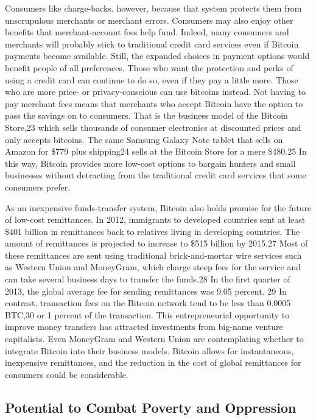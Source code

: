 Consumers like charge-backs, however, because that system
protects them from unscrupulous merchants or merchant errors.
Consumers may also enjoy other benefits that merchant-account
fees help fund. Indeed, many consumers and merchants will probably
stick to traditional credit card services even if Bitcoin payments
become available. Still, the expanded choices in payment
options would benefit people of all preferences.
Those who want the protection and perks of using a credit
card can continue to do so, even if they pay a little more. Those
who are more price- or privacy-conscious can use bitcoins
instead. Not having to pay merchant fees means that merchants
who accept Bitcoin have the option to pass the savings on to consumers.
That is the business model of the Bitcoin Store,23 which
sells thousands of consumer electronics at discounted prices and
only accepts bitcoins. The same Samsung Galaxy Note tablet that
sells on Amazon for \$779 plus shipping24 sells at the Bitcoin Store
for a mere \$480.25 In this way, Bitcoin provides more low-cost
options to bargain hunters and small businesses without detracting
from the traditional credit card services that some consumers
prefer.

As an inexpensive funds-transfer system, Bitcoin also holds
promise for the future of low-cost remittances. In 2012, immigrants
to developed countries sent at least \$401 billion in remittances
back to relatives living in developing countries. The
amount of remittances is projected to increase to \$515 billion
by 2015.27 Most of these remittances are sent using traditional
brick-and-mortar wire services such as Western Union and
MoneyGram, which charge steep fees for the service and can take
several business days to transfer the funds.28 In the first quarter of
2013, the global average fee for sending remittances was 9.05 percent.
29 In contrast, transaction fees on the Bitcoin network tend
to be less than 0.0005 BTC,30 or 1 percent of the transaction. This
entrepreneurial opportunity to improve money transfers has
attracted investments from big-name venture capitalists. Even
MoneyGram and Western Union are contemplating whether to
integrate Bitcoin into their business models. Bitcoin allows for
instantaneous, inexpensive remittances, and the reduction in the
cost of global remittances for consumers could be considerable.

\subsection{Potential to Combat Poverty and Oppression}

